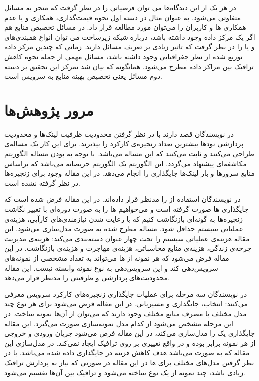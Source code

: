 در هر یک از این دیدگاه‌ها می توان فرضیاتی را در نظر گرفت که منجر به مسائل متفاوتی می‌شود.
به عنوان مثال در دسته اول نحوه قیمت‌گذاری، همکاری و یا عدم همکاری ‌ها و کاربران را می‌توان مورد مطالعه قرار داد.
در مسائل تخصیص منابع هم اگر یک مرکز داده وجود داشته باشد،
درباره شبکه زیرساخت می توان انواع همبندی‌های  و یا  را در نظر گرفت
که تاثیر زیادی بر تعریف مسائل دارند.
زمانی که چندین مرکز داده توزیع شده از نظر جغرافیایی وجود داشته باشد،
مسائل مهمی از جمله نحوه کاهش ترافیک بین مراکز داده مطرح می‌شود.
همانگونه که بیان شد تمرکز این تحقیق بر دسته دوم مسائل یعنی تخصیص بهینه منابع به سرویس است.

\section{مرور پژوهش‌ها}

در \cite{Eramo2016}
نویسندگان قصد دارند با در نظر گرفتن محدودیت ظرفیت لینک‌ها و محدودیت پردازشی نودها
بیشترین تعداد زنجیره‌ی کارکرد را بپذیرند. برای این کار یک مساله‌ی 
طراحی می‌کنند و ثابت می‌کنند که این مساله  می‌باشد.
با توجه به 
بودن مساله الگوریتم مکاشفه‌ای 
پیشنهاد می‌گردد. این الگوریتم یک الگوریتم حریصانه می‌باشد که براساس
منابع سرورها و بار لینک‌ها جایگذاری را انجام می‌دهد.
در این مقاله وجود  برای زنجیره‌ها در نظر گرفته نشده است.

در \cite{AbuLebdeh2017}
نویسندگان استفاده از  را مدنظر قرار داده‌اند.
 در این مقاله فرض شده است که جایگذاری ها صورت گرفته است
و می‌خواهیم ها را به صورت دوره‌ای با تغییر نگاشت زنجیره‌ها به گونه‌ای بازنگاشت کنیم
که با رعایت شدن نیازمندی‌های کارآیی، هزینه‌ی عملیاتی سیستم حداقل شود.
مساله مطرح شده به صورت  مدل‌سازی می‌شود.
این مقاله هزینه‌ی عملیاتی سیستم را تحت چهار عنوان دسته‌بندی می‌کند:
هزینه‌ی مدیریت چرخه‌ی زندگی، هزینه‌ی منابع محاسباتی، هزینه‌ی مهاجرت و هزینه‌ی بازنگاشت.
در این مقاله فرض می‌شود که هر نمونه از ها می‌تواند به تعداد مشخصی از نمونه‌های 
سرویس‌دهی کند و این سرویس‌دهی به نوع نمونه وابسته نیست.
این مقاله محدودیت‌های پردازشی و ظرفیتی را مدنظر قرار می‌دهد.

در \cite{Ghaznavi2017}
نویسندگان سه مرحله برای عملیات جایگذاری زنجیره‌های کارکرد سرویس معرفی می‌کنند:
انتخاب،
جایگذاری و
مسیریابی.
در این مقاله فرض می‌شود برای هر نوع 
چند مدل مختلف با مصرف منابع مختلف وجود دارند که می‌توان از آن‌ها نمونه ساخت. در این مرحله مشخص می‌شود
از کدام مدل نمونه‌سازی صورت می‌گیرد.
این مقاله جایگذاری یک  را مدل‌سازی می‌کند،
در این مقاله فرض می‌شود جریان ورودی و خروجی از هر نمونه برابر بوده و در واقع
 تغییری بر روی ترافیک ایجاد نمی‌کند.
در مدل‌سازی این مقاله که به صورت  می‌باشد هدف کاهش هزینه در جایگذاری  داده شده می‌باشد.
با در نظر گرفتن مدل‌های مختلف برای ها در این مقاله
در صورتی که نیاز به پردازش ترافیک زیادی باشد، چند نمونه از یک نوع 
ساخته می‌شود و ترافیک بین آن‌ها تقسیم می‌شود.

